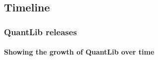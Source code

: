 \documentclass[compress]{beamer}
\begin{document}
\subsection{Timeline}
\begin{frame}
  \frametitle{QuantLib releases}
  \framesubtitle{Showing the growth of QuantLib over time}

  \begin{columns}



\end{columns}
\end{frame}
\end{document}
